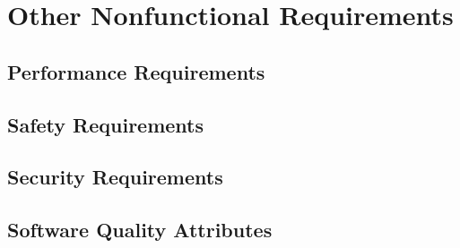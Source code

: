 \section{Other Nonfunctional Requirements}
%

\subsection{Performance Requirements}

\subsection{Safety Requirements}

\subsection{Security Requirements}
%

\subsection{Software Quality Attributes}


